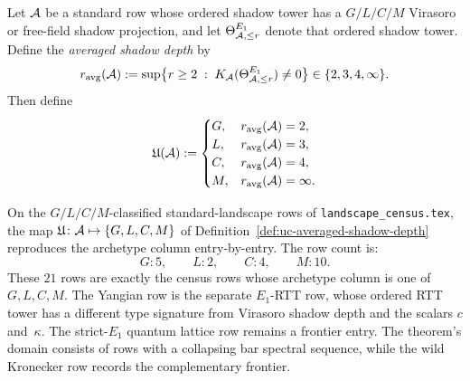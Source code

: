 \begin{definition}
\label{def:uc-averaged-shadow-depth}
Let $\mathcal{A}$ be a standard row whose ordered shadow tower has a
$G/L/C/M$ Virasoro or free-field shadow projection, and let
$\Theta^{E_1}_{\mathcal{A},\le r}$ denote that ordered shadow tower. Define the
\emph{averaged shadow depth} by
\[
 r_{\mathrm{avg}}(\mathcal{A})
 :=
 \sup\bigl\{
 r\geq 2 \;:\; K_{\mathcal{A}}(\Theta^{E_1}_{\mathcal{A},\le r})\neq 0
 \bigr\}
 \in \{2,3,4,\infty\}.
\]
Then define
\[
 \mathfrak U(\mathcal{A})
 :=
 \begin{cases}
 G, & r_{\mathrm{avg}}(\mathcal{A})=2,\\
 L, & r_{\mathrm{avg}}(\mathcal{A})=3,\\
 C, & r_{\mathrm{avg}}(\mathcal{A})=4,\\
 M, & r_{\mathrm{avg}}(\mathcal{A})=\infty.
 \end{cases}
\]
\end{definition}

\begin{theorem}
\label{thm:uc-landscape-universality}
\ClaimStatusProvedHere
On the $G/L/C/M$-classified standard-landscape rows of
\texttt{landscape\_census.tex}, the map
$\mathfrak U\colon \mathcal{A}\mapsto\{G,L,C,M\}$ of
Definition~\ref{def:uc-averaged-shadow-depth} reproduces the archetype
column entry-by-entry. The row count is:
\[
 G:5,\qquad L:2,\qquad C:4,\qquad M:10.
\]
These $21$ rows are exactly the census rows whose archetype column is
one of $G,L,C,M$. The Yangian row is the separate $E_1$-RTT row, whose
ordered RTT tower has a different type signature from Virasoro shadow
depth and the scalars $c$ and~$\kappa$.  The strict-$E_1$ quantum
lattice row remains a frontier entry.  The theorem's domain consists
of rows with a collapsing bar spectral sequence, while the wild
Kronecker row records the complementary frontier.
\end{theorem}

